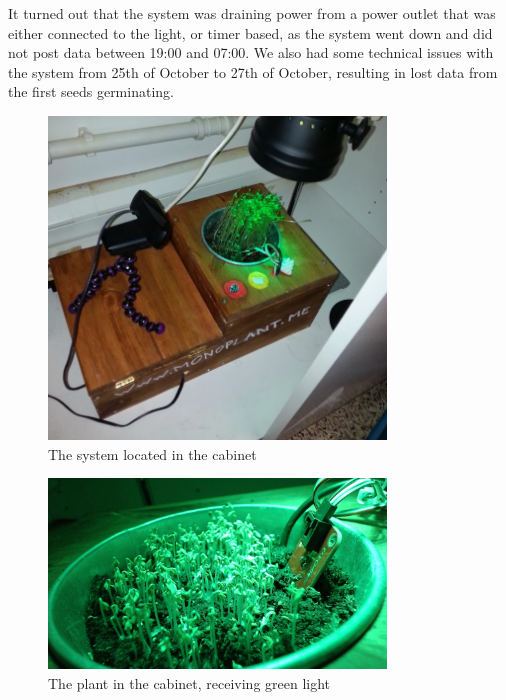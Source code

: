 It turned out that the system was draining power from a power outlet that was either connected to the light, or timer based, as the system went down and did not post data between 19:00 and 07:00. We also had some technical issues with the system from 25th of October to 27th of October, resulting in lost data from the first seeds germinating.

\begin{figure}
\centering
\includegraphics[width=0.8\textwidth]{img/empiricalsetting/cupboard.jpg}
\caption{The system located in the cabinet}
\label{fig:cabinetplant}
\end{figure}

\begin{figure}
\centering
\includegraphics[width=0.8\textwidth]{img/empiricalsetting/cupboardsystem.jpg}
\caption{The plant in the cabinet, receiving green light}
\label{fig:cabinetsystemplant}
\end{figure}

